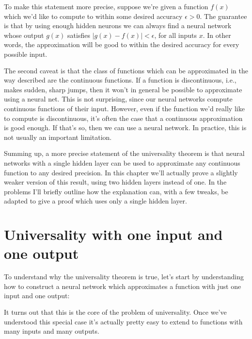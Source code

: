 \documentclass[a4paper,twoside,10pt]{book}
\begin{document}
To make this statement more precise, suppose we're given a function $f(x)$ which we'd like to compute to within some desired accuracy $\epsilon>0$. The guarantee is that by using enough hidden neurons we can always find a neural network whose output $g(x)$ satisfies $|g(x)-f(x)|<\epsilon$, for all inputs $x$. In other words, the approximation will be good to within the desired accuracy for every possible input.

The second caveat is that the class of functions which can be approximated in the way described are the continuous functions. If a function is discontinuous, i.e., makes sudden, sharp jumps, then it won't in general be possible to approximate using a neural net. This is not surprising, since our neural networks compute continuous functions of their input. However, even if the function we'd really like to compute is discontinuous, it's often the case that a continuous approximation is good enough. If that's so, then we can use a neural network. In practice, this is not usually an important limitation.

Summing up, a more precise statement of the universality theorem is that neural networks with a single hidden layer can be used to approximate any continuous function to any desired precision. In this chapter we'll actually prove a slightly weaker version of this result, using two hidden layers instead of one. In the problems I'll briefly outline how the explanation can, with a few tweaks, be adapted to give a proof which uses only a single hidden layer.

\section{Universality with one input and one output}
To understand why the universality theorem is true, let's start by understanding how to construct a neural network which approximates a function with just one input and one output:
\begin{center} 
\end{center}
It turns out that this is the core of the problem of universality. Once we've understood this special case it's actually pretty easy to extend to functions with many inputs and many outputs.
\end{document}
